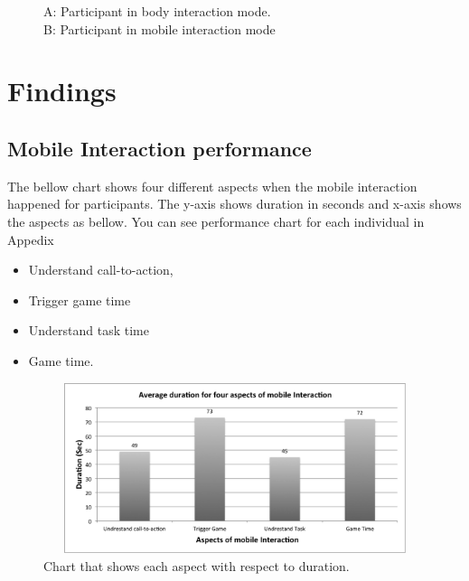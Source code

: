 \begin{figure}[H]
    \centering
    \caption{A: Participant in body interaction mode.\\  B: Participant in mobile interaction mode}%
    \label{fig:Focus_group_room}%
\end{figure}

\section{Findings}

\subsection{Mobile Interaction performance}
The bellow chart shows four different aspects when the mobile interaction happened for participants. The y-axis shows duration in seconds and x-axis shows the aspects as bellow. You can see performance chart for each individual in Appedix 
\begin{itemize}
\item Understand call-to-action,
\item Trigger game time
\item Understand task time
\item Game time.
\end{itemize}

\begin{figure}[H]
\centering
\includegraphics[width=12cm,height=5cm]{Figures/6/mobile_average}%
 \caption{Chart that shows each aspect with respect to duration. }%
 \label{fig:mobile_average}%
\end{figure}

